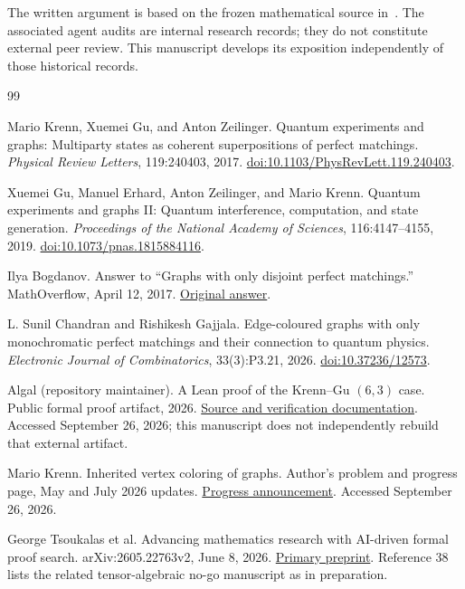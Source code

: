 \documentclass[11pt]{article}
\theoremstyle{definition}
\theoremstyle{plain}
\numberwithin{equation}{section}
\begin{document}
The written argument is based on the frozen mathematical source
in~\cite{review}. The associated agent audits are internal research records;
they do not constitute external peer review. This manuscript develops its
exposition independently of those historical records.

\begingroup
\small
\raggedright
\begin{thebibliography}{99}

Mario Krenn, Xuemei Gu, and Anton Zeilinger.
Quantum experiments and graphs: Multiparty states as coherent superpositions
of perfect matchings. \emph{Physical Review Letters}, 119:240403, 2017.
\href{https://doi.org/10.1103/PhysRevLett.119.240403}{doi:10.1103/PhysRevLett.119.240403}.

Xuemei Gu, Manuel Erhard, Anton Zeilinger, and Mario Krenn.
Quantum experiments and graphs II: Quantum interference, computation,
and state generation. \emph{Proceedings of the National Academy of Sciences},
116:4147--4155, 2019.
\href{https://doi.org/10.1073/pnas.1815884116}{doi:10.1073/pnas.1815884116}.

Ilya Bogdanov.
Answer to ``Graphs with only disjoint perfect matchings.''
MathOverflow, April 12, 2017.
\href{https://mathoverflow.net/a/267013}{Original answer}.

L. Sunil Chandran and Rishikesh Gajjala.
Edge-coloured graphs with only monochromatic perfect matchings and their
connection to quantum physics.
\emph{Electronic Journal of Combinatorics}, 33(3):P3.21, 2026.
\href{https://doi.org/10.37236/12573}{doi:10.37236/12573}.

Algal (repository maintainer).
A Lean proof of the Krenn--Gu \((6,3)\) case. Public formal proof artifact, 2026.
\href{https://github.com/algal/krenn-gu-6x3-certificate}{Source and verification documentation}.
Accessed September 26, 2026; this manuscript does not independently rebuild
that external artifact.

Mario Krenn.
Inherited vertex coloring of graphs. Author's problem and progress page,
May and July 2026 updates.
\href{https://mariokrenn.wordpress.com/graph-theory-question/}{Progress announcement}.
Accessed September 26, 2026.

George Tsoukalas et al.
Advancing mathematics research with AI-driven formal proof search.
arXiv:2605.22763v2, June 8, 2026.
\href{https://arxiv.org/abs/2605.22763v2}{Primary preprint}.
Reference 38 lists the related tensor-algebraic no-go manuscript as in preparation.


\end{thebibliography}
\end{document}
